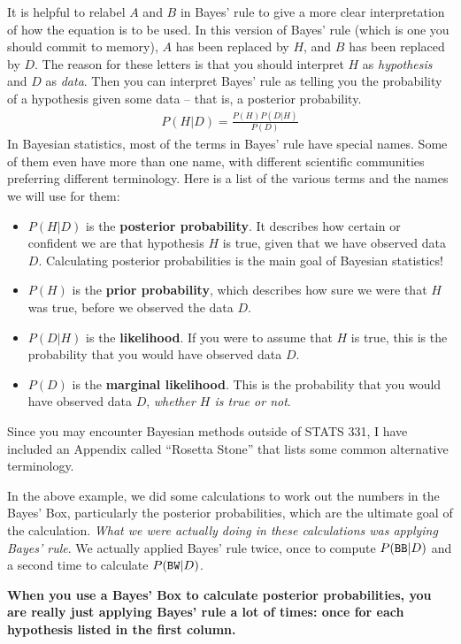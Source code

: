 It is helpful to relabel $A$ and $B$ in Bayes' rule to give a more clear
interpretation of how the equation is to be used. In this version of Bayes'
rule (which is one you should commit to memory), $A$ has been replaced by $H$,
and $B$ has been replaced by $D$. The reason for these letters is that you should
interpret $H$ as {\it hypothesis} and $D$ as {\it data}. Then you can interpret
Bayes' rule as telling you the probability of a hypothesis given some data --
that is, a posterior probability.
\begin{eqnarray}
P(H|D) = \frac{P(H)P(D|H)}{P(D)}
\end{eqnarray}
In Bayesian statistics, most of the terms in Bayes' rule have special names.
Some of them even have more than one name, with different scientific
communities preferring different terminology. Here is a list of the
various terms and the names we will use for them:
\begin{itemize}
\item $P(H|D)$ is the {\bf posterior probability}. It describes how certain
or confident we are that
hypothesis $H$ is true, given that we have observed data $D$. Calculating
posterior probabilities is the main goal of Bayesian statistics!
\item $P(H)$ is the {\bf prior probability}, which describes how sure we were
that $H$ was true, before we observed the data $D$.
\item $P(D|H)$ is the {\bf likelihood}. If you were to assume that $H$ is true,
this is the probability that you would have observed data $D$.
\item $P(D)$ is the {\bf marginal likelihood}. This is the probability that you
would have observed data $D$, {\it whether $H$ is true or not}.
\end{itemize}
Since you may encounter Bayesian methods outside of STATS 331, I have included
an Appendix called ``Rosetta Stone'' that lists some common alternative
terminology.

In the above example, we did some calculations to work out the numbers in the
Bayes' Box, particularly the posterior probabilities, which are the ultimate
goal of the calculation. {\it What we were actually doing in these calculations
was applying Bayes' rule}. We actually applied Bayes' rule twice, once to
compute $P(\texttt{BB} | D)$ and a second time to calculate $P(\texttt{BW} | D)$.

\begin{framed}
{\bf When you use a Bayes' Box to calculate posterior probabilities,
you are really just applying Bayes' rule a lot of times:
once for each hypothesis listed in the first column.}
\end{framed}

